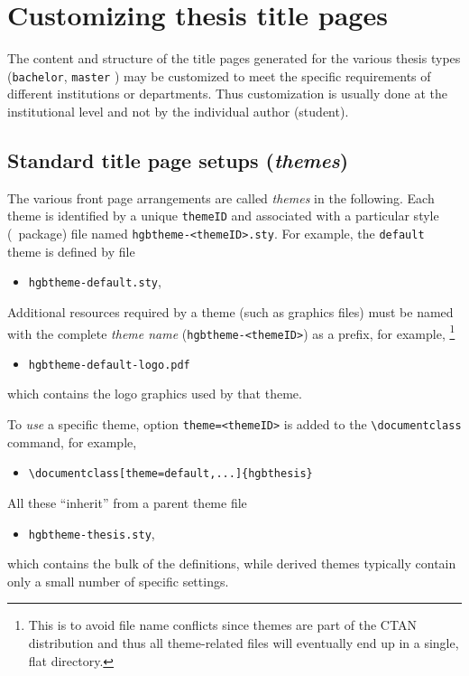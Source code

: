\documentclass[english]{hgbarticle}
\begin{document}
\section{Customizing thesis title pages}

The content and structure of the title pages generated for the various thesis types
(\texttt{bachelor}, \texttt{master} \etc) may be customized to meet the specific
requirements of different institutions or departments.
Thus customization is usually done at the institutional level and not
by the individual author (student).

\subsection{Standard title page setups (\emph{themes})}

The various front page arrangements are called \emph{themes} in the following.
Each theme is identified by a unique \texttt{themeID} and associated with a 
particular style (\latex\ package) file named \verb!hgbtheme-<themeID>.sty!.
For example, the \texttt{default} theme  is defined by file
\begin{itemize}
  \item[] \texttt{hgbtheme-default.sty},
\end{itemize}
%
Additional resources required by a theme (such as graphics files) must be named with the 
complete \emph{theme name} (\verb!hgbtheme-<themeID>!) as a prefix, for example,%
\footnote{This is to avoid file name conflicts since themes are part of the 
CTAN distribution and thus all theme-related files will eventually end up in a single, 
flat directory.}
\begin{itemize}
	\item[] \texttt{hgbtheme-default-logo.pdf}
\end{itemize}
%
which contains the logo graphics used by that theme.

To \emph{use} a specific theme, option \verb!theme=<themeID>! is added to the 
\verb!\documentclass! command, for example,
\begin{itemize}
	\item[] \verb!\documentclass[theme=default,...]{hgbthesis}!
\end{itemize}


All these ``inherit'' from a parent theme file
%
\begin{itemize}
  \item[] \texttt{hgbtheme-thesis.sty},
\end{itemize}
%
which contains the bulk of the definitions, while derived themes typically contain only 
a small number of specific settings.
\end{document}
